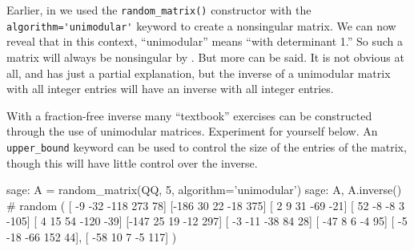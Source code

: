 %
Earlier, in  we used the \verb?random_matrix()? constructor with the \verb?algorithm='unimodular'? keyword to create a nonsingular matrix.  We can now reveal that in this context, ``unimodular'' means ``with determinant 1.''  So such a matrix will always be nonsingular by .  But more can be said.  It is not obvious at all, and  has just a partial explanation, but the inverse of a unimodular matrix with all integer entries will have an inverse with all integer entries.\par
%
With a fraction-free inverse many ``textbook'' exercises can be constructed through the use of unimodular matrices.  Experiment for yourself below.  An \verb?upper_bound? keyword can be used to control the size of the entries of the matrix, though this will have little control over the inverse.
%
\begin{sageexample}
sage: A = random_matrix(QQ, 5, algorithm='unimodular')
sage: A, A.inverse()                          # random
(
[  -9  -32 -118  273   78]  [-186   30   22  -18  375]
[   2    9   31  -69  -21]  [  52   -8   -8    3 -105]
[   4   15   54 -120  -39]  [-147   25   19  -12  297]
[  -3  -11  -38   84   28]  [ -47    8    6   -4   95]
[  -5  -18  -66  152   44], [ -58   10    7   -5  117]
)
\end{sageexample}
%
\begin{sageverbatim}
\end{sageverbatim}
%

